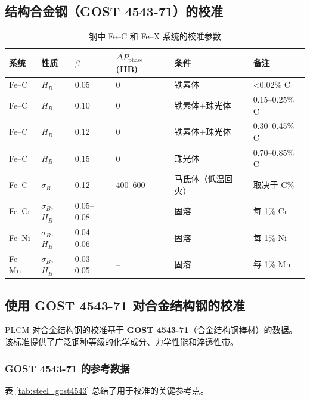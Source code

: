 \documentclass[12pt,a4paper]{article}
\begin{document}
	\subsection{结构合金钢（GOST 4543-71）的校准}
	\begin{longtable}{p{2.5cm} p{1.2cm} p{1.2cm} p{1.5cm} p{2.0cm} p{2.0cm}}
		\caption{钢中 Fe–C 和 Fe–X 系统的校准参数}\\
		\toprule
		\textbf{系统} & \textbf{性质} & $\beta$ & $\Delta P_{\text{phase}}$ (HB) & \textbf{条件} & \textbf{备注} \\
		\midrule
		Fe–C & $H_B$ & 0.05 & 0 & 铁素体 & <0.02\% C \\
		Fe–C & $H_B$ & 0.10 & 0 & 铁素体+珠光体 & 0.15–0.25\% C \\
		Fe–C & $H_B$ & 0.12 & 0 & 铁素体+珠光体 & 0.30–0.45\% C \\
		Fe–C & $H_B$ & 0.15 & 0 & 珠光体 & 0.70–0.85\% C \\
		Fe–C & $\sigma_B$ & 0.12 & 400–600 & 马氏体（低温回火） & 取决于 C\% \\
		Fe–Cr & $\sigma_B$, $H_B$ & 0.05–0.08 & – & 固溶 & 每 1\% Cr \\
		Fe–Ni & $\sigma_B$, $H_B$ & 0.04–0.06 & – & 固溶 & 每 1\% Ni \\
		Fe–Mn & $\sigma_B$, $H_B$ & 0.03–0.05 & – & 固溶 & 每 1\% Mn \\
		\bottomrule
	\end{longtable}
	
	
	\subsection{使用 GOST 4543-71 对合金结构钢的校准}
	\label{subsec:steel_calibration_gost4543}
	
	PLCM 对合金结构钢的校准基于 \textbf{GOST 4543-71}（合金结构钢棒材）的数据。该标准提供了广泛钢种等级的化学成分、力学性能和淬透性带。
	
	\subsubsection{GOST 4543-71 的参考数据}
	表 \ref{tab:steel_gost4543} 总结了用于校准的关键参考点。
	
\end{document}
